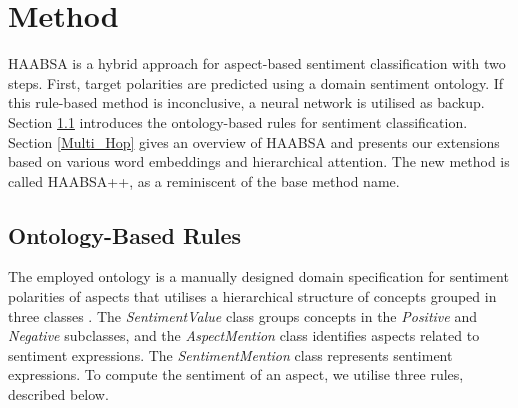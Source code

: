 \documentclass[hidelinks]{llncs}
\begin{document}
\begin{table}[t]
\vspace{-0.5cm}
\footnotesize
\centering
\setlength{\tabcolsep}{0pt} \caption{Polarity frequencies of SemEval 2015 and SemEval 2016 datasets (ABSA).}
\label{table:table_1}
\vspace{-0.5cm}
\end{table}

\section{Method}\label{Method}

HAABSA is a hybrid approach for aspect-based sentiment classification with two steps. First, target polarities are predicted using a domain sentiment ontology. If this rule-based method is inconclusive, a neural network is utilised as backup. Section \ref{Ontology} introduces the ontology-based rules for sentiment classification. Section \ref{Multi_Hop} gives an overview of HAABSA and presents our extensions based on various word embeddings and hierarchical attention. The new method is called HAABSA++, as a reminiscent of the base method name.



\subsection{Ontology-Based Rules}\label{Ontology}
The employed ontology is a manually designed domain specification for sentiment polarities of aspects that utilises a hierarchical structure of concepts grouped in three classes \cite{schouten2018ontology}. The \textit{SentimentValue} class groups concepts in the \textit{Positive} and \textit{Negative} subclasses, and the \textit{AspectMention} class identifies aspects related to sentiment expressions. The \textit{SentimentMention} class represents sentiment expressions. To compute the sentiment of an aspect, we utilise three rules, described below.
\end{document}
